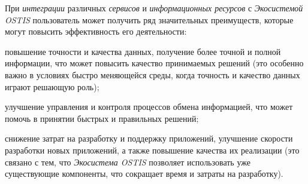 При \textit{интеграции} различных \textit{сервисов} и \textit{информационных ресурсов} с \textit{Экосистемой OSTIS} пользователь может получить ряд значительных преимуществ, которые могут повысить эффективность его деятельности:
\begin{textitemize}
	\item повышение точности и качества данных, получение более точной и полной информации, что может повысить качество принимаемых решений (это особенно важно в условиях быстро меняющейся среды, когда точность и качество данных играют решающую роль);
	\item улучшение управления и контроля процессов обмена информацией, что может помочь в принятии быстрых и правильных решений;
	\item снижение затрат на разработку и поддержку приложений, улучшение скорости разработки новых приложений, а также повышение качества их реализации (это связано с тем, что \textit{Экосистема OSTIS} позволяет использовать уже существующие компоненты, что сокращает время и затраты на разработку).
\end{textitemize}
